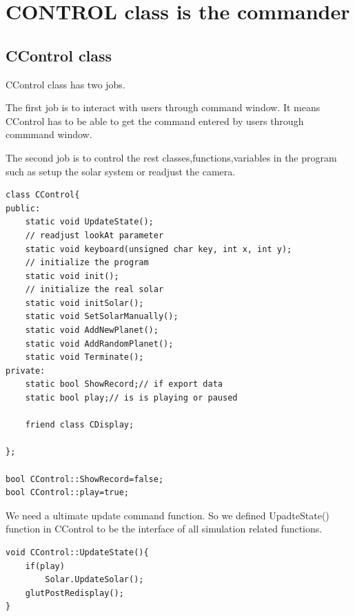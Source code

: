 \documentclass[12pt]{article}
\begin{document}
\clearpage
\section{CONTROL class is the commander}
\subsection{CControl class}
CControl class has two jobs.

The first job is to interact with users through command window.
It means CControl has to be able to get the command entered by users through commmand window.

The second job is to control the rest classes,functions,variables in the program such as setup the solar
system or readjust the camera.

\begin{lstlisting}[caption=CControl class]
class CControl{
public:
    static void UpdateState();
    // readjust lookAt parameter 
    static void keyboard(unsigned char key, int x, int y);
    // initialize the program
    static void init();
    // initialize the real solar
    static void initSolar();
    static void SetSolarManually();
    static void AddNewPlanet();
    static void AddRandomPlanet();
    static void Terminate();
private:
    static bool ShowRecord;// if export data
    static bool play;// is is playing or paused
    
    friend class CDisplay;

};

bool CControl::ShowRecord=false;
bool CControl::play=true;
\end{lstlisting}
\clearpage
We need a ultimate update command function.
So we defined UpadteState() function in CControl
to be the interface of all simulation related functions.
\begin{lstlisting}[caption=UpdateState()]
void CControl::UpdateState(){
    if(play)
        Solar.UpdateSolar();
    glutPostRedisplay();   
}
\end{lstlisting}
\end{document}
